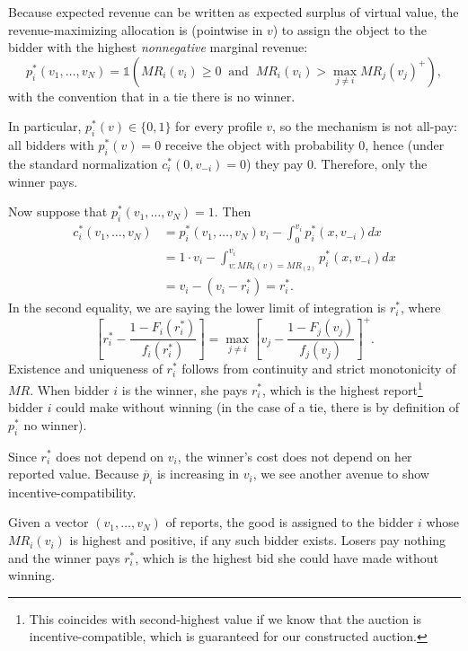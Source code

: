 \begin{remark}
	Because expected revenue can be written as expected surplus of virtual value, the revenue-maximizing
	allocation is (pointwise in $v$) to assign the object to the bidder with the highest
	\emph{nonnegative} marginal revenue:
	\[
	p_i^*(v_1,\ldots,v_N)
	=
	\mathds{1}\!\left(
	MR_i(v_i)\ge 0
	\ \text{ and }\
	MR_i(v_i)>\max_{j\neq i} MR_j(v_j)^+
	\right),
	\]
	with the convention that in a tie there is no winner.

	In particular, $p_i^*(v)\in\{0,1\}$ for every profile $v$, so the mechanism is not all-pay:
	all bidders with $p_i^*(v)=0$ receive the object with probability $0$, hence (under the
	standard normalization $c_i^*(0,v_{-i})=0$) they pay $0$.  Therefore, only the winner pays.
\end{remark}

Now suppose that $p_i^*(v_1,\ldots,v_N) = 1$. Then 
\begin{align*}
	c_i^*(v_1,\ldots,v_N) &= p_i^*(v_1,\ldots,v_N)v_i - \int_{0}^{v_i} p_i^*(x,v_{-i}) dx \\
	&= 1 \cdot v_i - \int_{v: MR_i(v) = MR_{(2)}}^{v_i} p_i^*(x,v_{-i})dx \\
	&= v_i - (v_i - r_i^*) = r_i^*
.\end{align*}
In the second equality, we are saying the lower limit of integration is $r_i^*$, where \[
	\left[ r_i^* - \frac{1-F_i(r_i^*)}{f_i(r_i^*)} \right] = \max_{j \ne i} \left[ v_j - \frac{1-F_j(v_j)}{f_j(v_j)} \right]^+
.\] Existence and uniqueness of $r_i^*$ follows from continuity and strict monotonicity of $MR$. When bidder $i$ is the winner, she pays $r_i^*$, which is the highest report\footnote{This coincides with second-highest value if we know that the auction is incentive-compatible, which is guaranteed for our constructed auction.} bidder $i$ could make without winning (in the case of a tie, there is by definition of $p_i^*$ no winner).

Since $r_i^*$ does not depend on $v_i$, the winner's cost does not depend on her reported value.
Because $\overline{p}_i$ is increasing in $v_i$, we see another avenue to show incentive-compatibility.

\begin{remark}
	Given a vector $(v_1,\ldots,v_N)$ of reports, the good is assigned to the bidder $i$ whose $MR_i(v_i)$ is highest and positive, if any such bidder exists. Losers pay nothing and the winner pays $r_i^*$, which is the highest bid she could have made without winning.
\end{remark}

